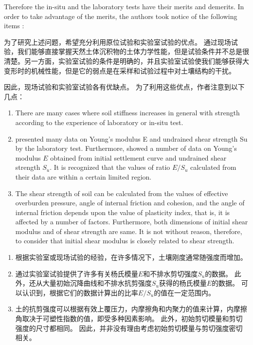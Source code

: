 \begin{paracol}{2}
    Therefore the in-situ and the laboratory tests have their merits and demerits. In order to take advantage of the merits, the authors took notice of the following items : 

    \switchcolumn

    为了研究上述问题，希望充分利用原位试验和实验室试验的优点。 通过现场试验，我们能够直接掌握天然土体沉积物的土体力学性能，但是试验条件并不总是很清楚。另一方面，实验室试验的条件是明确的，并且实验室试验使我们能够获得大变形时的机械性能，但是它的弱点是在采样和试验过程中对土壤结构的干扰。
  
    因此，现场试验和实验室试验各有优缺点。 为了利用这些优点，作者注意到以下几点：

    \switchcolumn*

    \begin{enumerate}
        \item There are many cases where soil stiffness increases in general with strength according to the experience of laboratory or in-situ test.
        \item \citet{Wilson2010419} presented many data on Young's modulus E and undrained shear strength Su by the laboratory test. Furthermore, \citet{DAppolonia19711359} showed a number of data on Young's modulus $E$ obtained from initial settlement curve and undrained shear strength $S_u$. It is recognized that the values of ratio $E/S_u$ calculated from their data are within a certain limited region.
        \item The shear strength of soil can be calculated from the values of effective overburden pressure, angle of internal friction and cohesion, and the angle of internal friction depends upon the value of plasticity index, that is, it is affected by a number of factors. Furthermore, both dimensions of initial shear modulus and of shear strength are same. It is not without reason, therefore, to consider that initial shear modulus is closely related to shear strength.
    \end{enumerate}

    \switchcolumn

    \begin{enumerate}
        \item 根据实验室或现场试验的经验，在许多情况下，土壤刚度通常随强度而增加。
        \item \citet{Wilson2010419}通过实验室试验提供了许多有关杨氏模量$E$和不排水剪切强度$S_u$的数据。 此外，\citet{DAppolonia19711359}还从大量初始沉降曲线和不排水抗剪强度$S_u$获得的杨氏模量$E$的数据。 可以认识到，根据它们的数据计算出的比率$E/S_u$的值在一定范围内。
        \item 土的抗剪强度可以根据有效上覆压力，内摩擦角和内聚力的值来计算，内摩擦角取决于可塑性指数的值，即受多种因素影响。 此外，初始剪切模量和剪切强度的尺寸都相同。 因此，并非没有理由考虑初始剪切模量与剪切强度密切相关。
    \end{enumerate}


\end{paracol}

